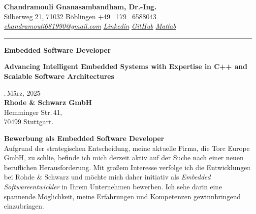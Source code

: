 \documentclass[a4paper,10pt]{article}
\newcommand{\link}[1]{{\textit{#1}}}
\begin{document}
\thispagestyle{plain}

\begin{center}
    {\Large \textbf{Chandramouli Gnanasambandham, Dr.-Ing.}}\\ 
    
    \vspace{0.2cm}
    \small Silberweg 21, 71032 B\"oblingen \hfill  \bullet  \hfill  +49 \ 179 \ 6588043 \hfill \bullet  \hfill
    \textup{\href{mailto:chandramouli681990@gmail.com}{\link{chandramouli681990@gmail.com}}} \hfill \bullet \hfill
    \textup{\href{https://www.linkedin.com/in/ganasambandhamc/}{\link{Linkedin}}} \hfill \bullet \hfill
    \textup{\href{https://github.com/chandramouli6890}{\link{GitHub}}} \hfill \bullet \hfill
    \textup{\href{https://de.mathworks.com/matlabcentral/profile/authors/4267772}{\link{Matlab}}}

    \vspace{-0.2cm}
    {\rule{\linewidth}{0.8pt}}

    \vspace{0.2cm}
    {\Large \textbf{Embedded Software Developer}}
    
    \vspace{0.1cm}
    \colorbox{gray!40}{%
        \parbox{0.99\textwidth}{%
        \centering \textcolor{highlightcolor}{\textbf{Advancing Intelligent Embedded Systems with Expertise in C++ and Scalable Software Architectures}}
        }%
    }
\end{center}

\vspace{0.5cm}
.\,M\"arz, 2025\\

{\noindent
    \textbf{Rhode \& Schwarz GmbH}\\
 Hemminger Str.\,41,\\
70499 Stuttgart.\\
}

\noindent \textbf{Bewerbung als Embedded Software Developer} \\


\noindent Aufgrund der strategischen Entscheidung, meine aktuelle Firma, die
Torc Europe GmbH, zu schlie\ssen, befinde ich mich derzeit aktiv auf der Suche
nach einer neuen beruflichen Herausforderung. Mit großem Interesse verfolge ich
die Entwicklungen bei Rohde \& Schwarz und m\"ochte mich daher initiativ als
\textit{Embedded Softwareentwickler} in Ihrem Unternehmen bewerben. Ich sehe
darin eine spannende Möglichkeit, meine Erfahrungen und Kompetenzen
gewinnbringend einzubringen. \\
\end{document}
